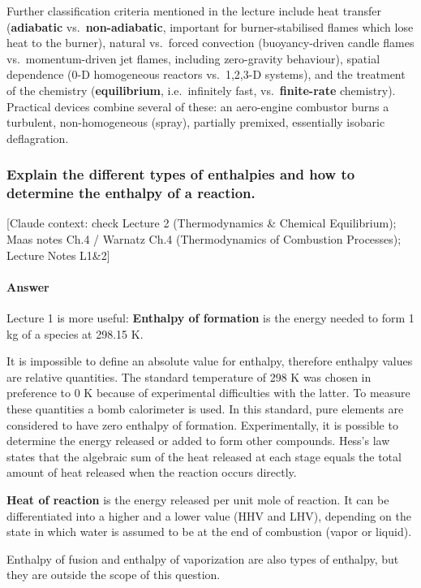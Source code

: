 {Further classification criteria mentioned in the lecture include heat transfer (\textbf{adiabatic} vs.\ \textbf{non-adiabatic}, important for burner-stabilised flames which lose heat to the burner), natural vs.\ forced convection (buoyancy-driven candle flames vs.\ momentum-driven jet flames, including zero-gravity behaviour), spatial dependence (0-D homogeneous reactors vs.\ 1,2,3-D systems), and the treatment of the chemistry (\textbf{equilibrium}, i.e.\ infinitely fast, vs.\ \textbf{finite-rate} chemistry). Practical devices combine several of these: an aero-engine combustor burns a turbulent, non-homogeneous (spray), partially premixed, essentially isobaric deflagration.
}


\subsubsection{Explain the different types of enthalpies and how to determine the enthalpy of a reaction.}

{\color{gray}\footnotesize [Claude context: check Lecture 2 (Thermodynamics \& Chemical Equilibrium); Maas notes Ch.4 / Warnatz Ch.4 (Thermodynamics of Combustion Processes); Lecture Notes L1\&2]}

\paragraph{Answer}
Lecture 1 is more useful: \textbf{Enthalpy of formation} is the energy needed to form 1 kg of a species at 298.15 K.

It is impossible to define an absolute value for enthalpy, therefore enthalpy values are relative quantities. The standard temperature of 298 K was chosen in preference to 0 K because of experimental difficulties with the latter. To measure these quantities a bomb calorimeter is used. In this standard, pure elements are considered to have zero enthalpy of formation. Experimentally, it is possible to determine the energy released or added to form other compounds. Hess's law states that the algebraic sum of the heat released at each stage equals the total amount of heat released when the reaction occurs directly.

\textbf{Heat of reaction} is the energy released per unit mole of reaction. It can be differentiated into a higher and a lower value (HHV and LHV), depending on the state in which water is assumed to be at the end of combustion (vapor or liquid).

Enthalpy of fusion and enthalpy of vaporization are also types of enthalpy, but they are outside the scope of this question.

